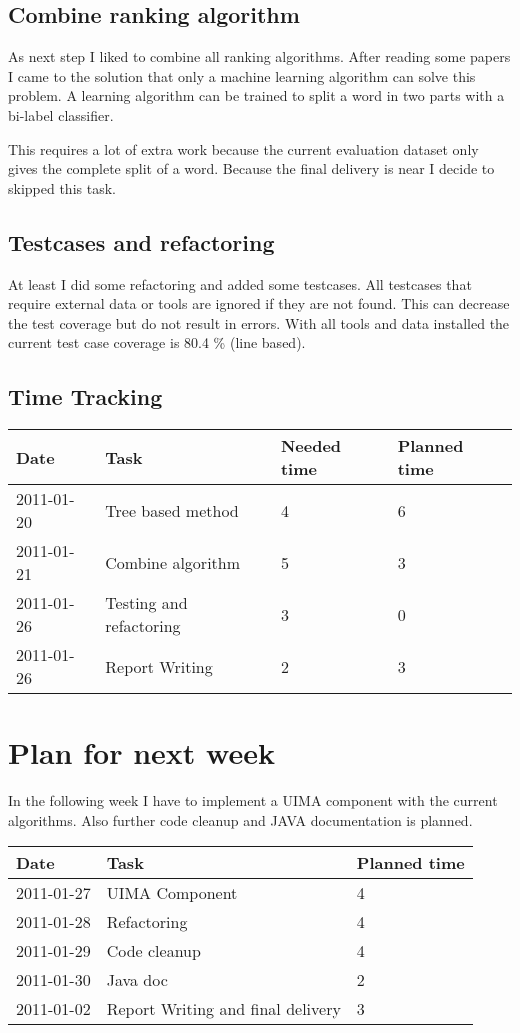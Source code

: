 \documentclass[11pt, accentcolor=tud9b, nochapname]{tudexercise}
\begin{document}
\subsection{Combine ranking algorithm}
As next step I liked to combine all ranking algorithms. After reading some papers I came to the solution that only a machine learning algorithm can solve this problem. A learning algorithm can be trained to split a word in two parts with a bi-label classifier.

This requires a lot of extra work because the current evaluation dataset only gives the complete split of a word. Because the final delivery is near I decide to skipped this task.

\subsection{Testcases and refactoring}
At least I did some refactoring and added some testcases. All testcases that require external data or tools are ignored if they are not found. This can decrease the test coverage but do not result in errors. With all tools and data installed the current test case coverage is 80.4 \% (line based).

\subsection{Time Tracking}

\begin{tabular}{l | l | l | l}
  \hline
  \textbf{Date} & \textbf{Task} & \textbf{Needed time} & \textbf{Planned time} \\ \hline
  2011-01-20 & Tree based method & 4 & 6 \\ \hline
  2011-01-21 & Combine algorithm & 5 & 3 \\ \hline
  2011-01-26 & Testing and refactoring & 3 & 0 \\ \hline
  2011-01-26 & Report Writing & 2 & 3 \\ \hline
\end{tabular}

\section{Plan for next week}
In the following week I have to implement a UIMA component with the current algorithms. Also further code cleanup and JAVA documentation is planned.

\vspace{10pt}
\begin{tabular}{l | l | l}
  \hline
  \textbf{Date} & \textbf{Task} & \textbf{Planned time} \\ \hline
  2011-01-27 & UIMA Component & 4 \\ \hline
  2011-01-28 & Refactoring & 4 \\ \hline
  2011-01-29 & Code cleanup & 4 \\ \hline
  2011-01-30 & Java doc & 2 \\ \hline
  2011-01-02 & Report Writing and final delivery & 3 \\ \hline
\end{tabular}
\end{document}
